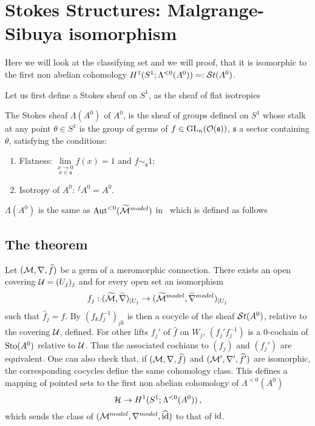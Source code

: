 \section{Stokes Structures: Malgrange-Sibuya isomorphism}
\begin{comment}
  \cite[Thm.I.2.1]{Loday1994}, \cite[Thm.4.3.9]{Loday2014} and
  \cite[Thm.II.6.2]{sabbah2007isomonodromic}
\end{comment}
Here we will look at the classifying set and we will proof, that it is
isomorphic \TODO[as\dots] to the first non abelian cohomology 
$H^1(S^1;\Lambda^{<0}(A^0))=:\mathcal{S}{}t(A^0)$.

Let us first define a Stokes sheaf on $S^1$, as the sheaf of flat
isotropies\TODO[\dots]
\begin{defn}
  The Stokes sheaf $\Lambda(A^0)$ of $A^0$, is the sheaf of groups defined on
  $S^1$ whose stalk at any point $\theta\in S^1$ is the group of germs of
  $f\in\operatorname{GL}_n(\mathcal{O}(\mathfrak{s}))$, $\mathfrak{s}$ a sector containing $\theta$, satisfying
  the conditions:
  \begin{enumerate}
    \item Flatness: $\underset{x\in\mathfrak{s}}{\underset{x\to0}{\lim}}f(x)=1$
      and $f\sim_{\mathfrak{s}} 1$;
    \item Isotropy of $A^0$: ${}^f\!A^0=A^0$.
  \end{enumerate}
  \begin{s-rem}
    $\Lambda(A^0)$ is the same as $\operatorname{Aut}^{<0}(\widetilde{\mathcal{M}}^{model})$
    in~\cite{sabbah2007isomonodromic} which is defined as follows \TODO
  \end{s-rem}
\end{defn}

\subsection{The theorem}
\begin{comment}
  \TODO[See \cite{thboalch} for sheaf-less definition]
\end{comment}
Let $(\mathcal{M},\nabla,\widehat f)$ be a germ of a  meromorphic connection.
There exists an open covering $\mathcal{U}=(U_j)_j$ and for every open set an
isomorphism
\[
  f_j:(\widetilde{\mathcal{M}},\widetilde\nabla)_{|U_j}
  \to(\widetilde{\mathcal{M}}^{model},\widetilde\nabla^{model})_{|U_j}
\]
such that $\hat f_j=f$. By $(f_kf_j^{-1})_{jk}$ is then a cocycle of the
sheaf $\mathcal{S}{}t(A^0)$, relative to the covering $\mathcal{U}$, defined.
For other lifts $f_j'$ of $\hat f$ on $W_j$, $(f_j'f_j^{-1})$ is a $0$-cochain
of $\operatorname{Sto}(A^0)$ relative to $\mathcal{U}$. Thus the associated cochians to $(f_j)$ and
$(f_j')$ are equivalent. One can also check that, if $(\mathcal{M},\nabla,\widehat f)$ and
$(\mathcal{M}',\nabla',\widehat f')$ are isomorphic, the corresponding cocycles define the
same cohomology class. This defines a mapping of pointed sets
to the first non abelian cohomology of $\Lambda^{<0}(A^0)$
\[
  \mathcal{H}\to H^1(S^1;\Lambda^{<0}(A^0)) \,,
\]
which sends the class of $(\mathcal{M}^{model},\nabla^{model},\widehat{\operatorname{id}})$ to that of
$\operatorname{id}$.

